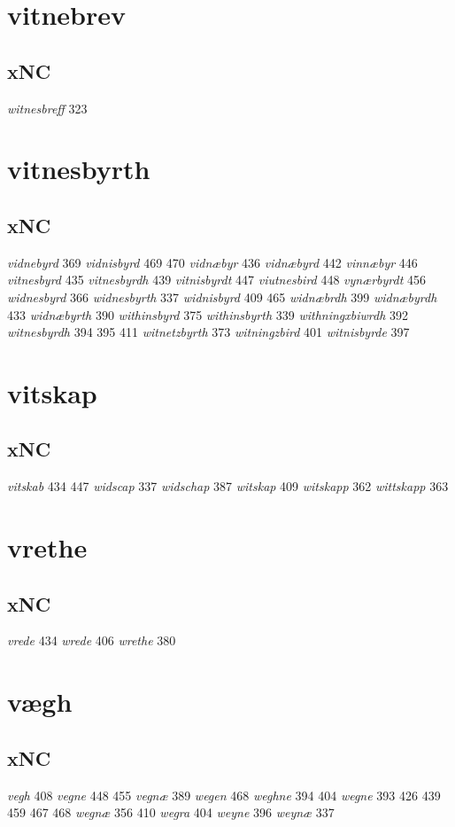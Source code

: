 \documentclass[a4paper,twocolumn]{article}
\begin{document}
\section{vitnebrev}
\label{sec:orga350bf4}
\subsection{xNC}
\label{sec:orga492ecb}
\emph{witnesbreff} 323 
\section{vitnesbyrth}
\label{sec:orgb68971c}
\subsection{xNC}
\label{sec:org6a904cb}
\emph{vidnebyrd} 369 \emph{vidnisbyrd} 469 470 \emph{vidnæbyr} 436 \emph{vidnæbyrd} 442 \emph{vinnæbyr} 446 \emph{vitnesbyrd} 435 \emph{vitnesbyrdh} 439 \emph{vitnisbyrdt} 447 \emph{viutnesbird} 448 \emph{vynærbyrdt} 456 \emph{widnesbyrd} 366 \emph{widnesbyrth} 337 \emph{widnisbyrd} 409 465 \emph{widnæbrdh} 399 \emph{widnæbyrdh} 433 \emph{widnæbyrth} 390 \emph{withinsbyrd} 375 \emph{withinsbyrth} 339 \emph{withningxbiwrdh} 392 \emph{witnesbyrdh} 394 395 411 \emph{witnetzbyrth} 373 \emph{witningzbird} 401 \emph{witnisbyrde} 397 
\section{vitskap}
\label{sec:orgd28b5d8}
\subsection{xNC}
\label{sec:orga1e56b6}
\emph{vitskab} 434 447 \emph{widscap} 337 \emph{widschap} 387 \emph{witskap} 409 \emph{witskapp} 362 \emph{wittskapp} 363 
\section{vrethe}
\label{sec:orge4e181b}
\subsection{xNC}
\label{sec:org9399556}
\emph{vrede} 434 \emph{wrede} 406 \emph{wrethe} 380 
\section{vægh}
\label{sec:orgfa78491}
\subsection{xNC}
\label{sec:orge4d0bbe}
\emph{vegh} 408 \emph{vegne} 448 455 \emph{vegnæ} 389 \emph{wegen} 468 \emph{weghne} 394 404 \emph{wegne} 393 426 439 459 467 468 \emph{wegnæ} 356 410 \emph{wegra} 404 \emph{weyne} 396 \emph{weynæ} 337 
\end{document}
